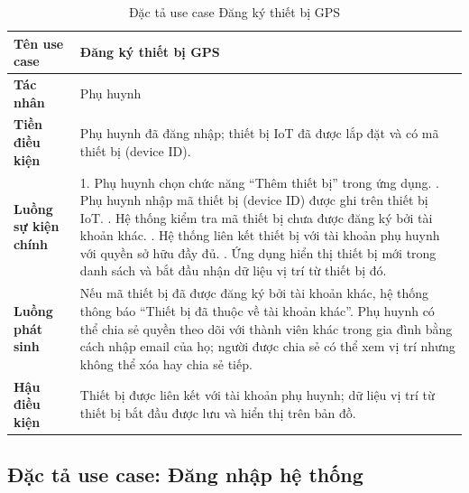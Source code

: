 \documentclass[../DoAn.tex]{subfiles}
\begin{document}
\begin{table}[H]
\centering
\caption{Đặc tả use case Đăng ký thiết bị GPS}
\label{table:uc_device}
\begin{tabular}{|l|p{9.5cm}|}
\hline
\textbf{Tên use case}       & Đăng ký thiết bị GPS \\
\hline
\textbf{Tác nhân}           & Phụ huynh \\
\hline
\textbf{Tiền điều kiện}     & Phụ huynh đã đăng nhập; thiết bị IoT đã được lắp đặt và có mã thiết bị (device ID). \\
\hline
\textbf{Luồng sự kiện chính} &
1. Phụ huynh chọn chức năng ``Thêm thiết bị'' trong ứng dụng. \newline
2. Phụ huynh nhập mã thiết bị (device ID) được ghi trên thiết bị IoT. \newline
3. Hệ thống kiểm tra mã thiết bị chưa được đăng ký bởi tài khoản khác. \newline
4. Hệ thống liên kết thiết bị với tài khoản phụ huynh với quyền sở hữu đầy đủ. \newline
5. Ứng dụng hiển thị thiết bị mới trong danh sách và bắt đầu nhận dữ liệu vị trí từ thiết bị đó. \\
\hline
\textbf{Luồng phát sinh}    & Nếu mã thiết bị đã được đăng ký bởi tài khoản khác, hệ thống thông báo ``Thiết bị đã thuộc về tài khoản khác''. Phụ huynh có thể chia sẻ quyền theo dõi với thành viên khác trong gia đình bằng cách nhập email của họ; người được chia sẻ có thể xem vị trí nhưng không thể xóa hay chia sẻ tiếp. \\
\hline
\textbf{Hậu điều kiện}      & Thiết bị được liên kết với tài khoản phụ huynh; dữ liệu vị trí từ thiết bị bắt đầu được lưu và hiển thị trên bản đồ. \\
\hline
\end{tabular}
\end{table}

\subsection{Đặc tả use case: Đăng nhập hệ thống}
\end{document}
